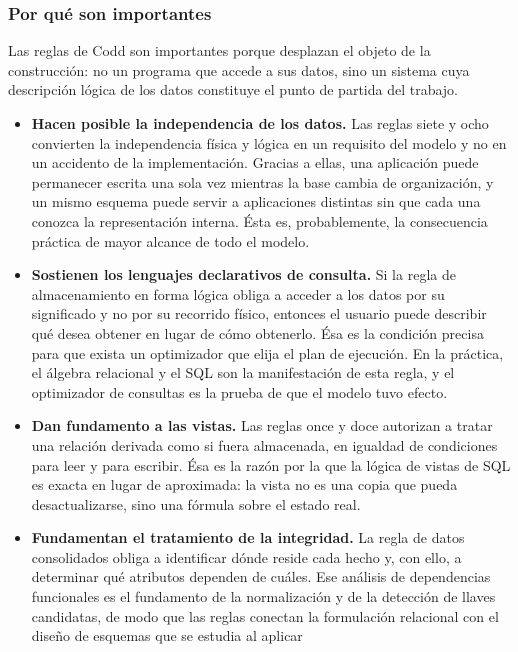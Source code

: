 \subsubsection*{Por qué son importantes}

Las reglas de Codd son importantes porque desplazan el objeto de la
construcción: no un programa que accede a sus datos, sino un sistema cuya
descripción lógica de los datos constituye el punto de partida del trabajo.

\begin{itemize}
  \item \textbf{Hacen posible la independencia de los datos.} Las reglas siete
    y ocho convierten la independencia física y lógica en un requisito del
    modelo y no en un accidento de la implementación. Gracias a ellas, una
    aplicación puede permanecer escrita una sola vez mientras la base cambia
    de organización, y un mismo esquema puede servir a aplicaciones distintas
    sin que cada una conozca la representación interna. Ésta es,
    probablemente, la consecuencia práctica de mayor alcance de todo el
    modelo.
  \item \textbf{Sostienen los lenguajes declarativos de consulta.} Si la regla
    de almacenamiento en forma lógica obliga a acceder a los datos por su
    significado y no por su recorrido físico, entonces el usuario puede
    describir qué desea obtener en lugar de cómo obtenerlo. Ésa es la
    condición precisa para que exista un optimizador que elija el plan de
    ejecución. En la práctica, el álgebra relacional y el SQL son la
    manifestación de esta regla, y el optimizador de consultas es la prueba de
    que el modelo tuvo efecto.
  \item \textbf{Dan fundamento a las vistas.} Las reglas once y doce autorizan
    a tratar una relación derivada como si fuera almacenada, en igualdad de
    condiciones para leer y para escribir. Ésa es la razón por la que la
    lógica de vistas de SQL es exacta en lugar de aproximada: la vista no es
    una copia que pueda desactualizarse, sino una fórmula sobre el estado
    real.
  \item \textbf{Fundamentan el tratamiento de la integridad.} La regla de
    datos consolidados obliga a identificar dónde reside cada hecho y, con
    ello, a determinar qué atributos dependen de cuáles. Ese análisis de
    dependencias funcionales es el fundamento de la normalización y de la
    detección de llaves candidatas, de modo que las reglas conectan la
    formulación relacional con el diseño de esquemas que se estudia al aplicar

\end{itemize}
